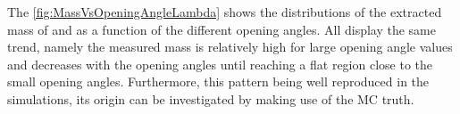 The \fig\ref{fig:MassVsOpeningAngleLambda} shows the distributions of the extracted mass of \rmLambda and \rmAlambda as a function of the different opening angles. All display the same trend, namely the measured mass is relatively high for large opening angle values and decreases with the opening angles until reaching a flat region close to the small opening angles. Furthermore, this pattern being well reproduced in the simulations, its origin can be investigated by making use of the MC truth. 

\begin{figure}[!p]
\hspace*{-2.cm}
\hspace*{-2.cm}
\hspace*{-2.cm}
\end{figure}
